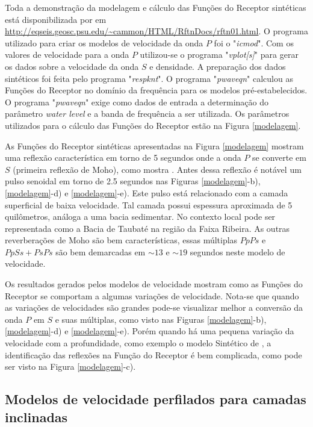 Toda a demonstração da modelagem e cálculo das Funções do Receptor sintéticas está disponibilizada por \cite{Ammon_waterlevel_1997} em \url{http://eqseis.geosc.psu.edu/~cammon/HTML/RftnDocs/rftn01.html}. O programa utilizado para criar os modelos de velocidade da onda $P$ foi o "\textit{icmod}". Com os valores de velocidade para a onda $P$ utilizou-se o programa "\textit{vplot[s]}" para gerar os dados sobre a velocidade da onda $S$ e densidade. A preparação dos dados sintéticos foi feita pelo programa "\textit{respknt}". O programa "\textit{pwaveqn}" calculou as Funções do Receptor no domínio da frequência para os modelos pré-estabelecidos. O programa "\textit{pwaveqn}" exige como dados de entrada a determinação do parâmetro \textit{water level} e a banda de frequência a ser utilizada. Os parâmetros utilizados para o cálculo das Funções do Receptor estão na Figura \ref{modelagem}.

As Funções do Receptor sintéticas apresentadas na Figura \ref{modelagem} mostram uma reflexão característica em torno de 5 segundos onde a onda $P$ se converte em $S$ (primeira reflexão de Moho), como mostra \cite{langston_structure_1979}. Antes dessa reflexão é notável um pulso senoidal em torno de 2.5 segundos nas Figuras \ref{modelagem}-b), \ref{modelagem}-d) e \ref{modelagem}-e). Este pulso está relacionado com a camada superficial de baixa velocidade. Tal camada possui espessura aproximada de 5 quilômetros, análoga a uma bacia sedimentar. No contexto local pode ser representada como a Bacia de Taubaté na região da Faixa Ribeira. As outras reverberações de Moho são bem características, essas múltiplas $PpPs$ e $PpSs+PsPs$ são bem demarcadas em $\sim 13$ e $\sim 19$ segundos neste modelo de velocidade.

Os resultados gerados pelos modelos de velocidade mostram como as Funções do Receptor se comportam a algumas variações de velocidade. Nota-se que quando as variações de velocidades são grandes pode-se visualizar melhor a conversão da onda $P$ em $S$ e suas múltiplas, como visto nas Figuras \ref{modelagem}-b), \ref{modelagem}-d) e \ref{modelagem}-e). Porém quando há uma pequena variação da velocidade com a profundidade, como exemplo o modelo Sintético de \cite{sand_franca_crustal_2004}, a identificação das reflexões na Função do Receptor é bem complicada, como pode ser visto na Figura \ref{modelagem}-c).

\subsection{Modelos de velocidade perfilados para camadas inclinadas}

